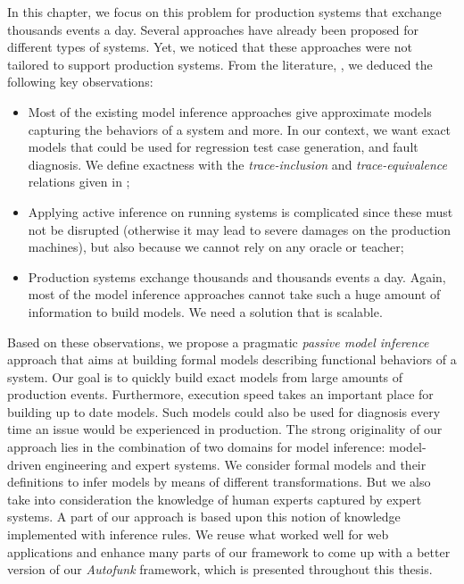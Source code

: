 In this chapter, we focus on this problem for production systems
that exchange thousands events a day. Several approaches have
already been proposed for different types of systems.  Yet, we
noticed that these approaches were not tailored to support
production systems. From the literature,
, we deduced the
following key observations:

\begin{itemize}
    \item Most of the existing model inference approaches give
        approximate models capturing the behaviors of a system
        and more. In our context, we want exact models that could
        be used for regression test case generation, and fault
        diagnosis. We define exactness with the
        \emph{trace-inclusion} and \emph{trace-equivalence}
        relations given in \cite{petrenko06};

    \item Applying active inference on running systems is
        complicated since these must not be disrupted (otherwise
        it may lead to severe damages on the production
        machines), but also because we cannot rely on any oracle
        or teacher;

    \item Production systems exchange thousands and thousands
        events a day. Again, most of the model inference
        approaches cannot take such a huge amount of information
        to build models. We need a solution that is scalable.
\end{itemize}

Based on these observations, we propose a pragmatic \emph{passive
model inference} approach that aims at building formal models
describing functional behaviors of a system. Our goal is to
quickly build exact models from large amounts of production
events.  Furthermore, execution speed takes an important place
for building up to date models. Such models could also be used
for diagnosis every time an issue would be experienced in
production.  The strong originality of our approach lies in the
combination of two domains for model inference: model-driven
engineering and expert systems. We consider formal models and
their definitions to infer models by means of different
transformations. But we also take into consideration the
knowledge of human experts captured by expert systems. A part of
our approach is based upon this notion of knowledge implemented
with inference rules. We reuse what worked well for web
applications and enhance many parts of our framework to come up
with a better version of our \textit{Autofunk} framework, which
is presented throughout this thesis.

